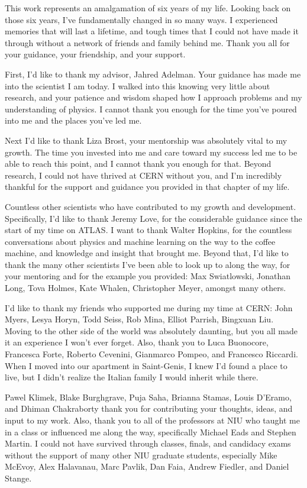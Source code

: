 This work represents an amalgamation of six years of my life. Looking back on those six years, I've fundamentally changed in so many ways. I experienced memories that will last a lifetime, and tough times that I could not have made it through without a network of friends and family behind me. Thank you all for your guidance, your friendship, and your support.

First, I'd like to thank my advisor, Jahred Adelman. Your guidance has made me into the scientist I am today. I walked into this knowing very little about research, and your patience and wisdom shaped how I approach problems and my understanding of physics. I cannot thank you enough for the time you've poured into me and the places you've led me.

Next I'd like to thank Liza Brost, your mentorship was absolutely vital to my growth. The time you invested into me and care toward my success led me to be able to reach this point, and I cannot thank you enough for that. Beyond research, I could not have thrived at CERN without you, and I'm incredibly thankful for the support and guidance you provided in that chapter of my life.

Countless other scientists who have contributed to my growth and development. Specifically, I'd like to thank Jeremy Love, for the considerable guidance since the start of my time on ATLAS. I want to thank Walter Hopkins, for the countless conversations about physics and machine learning on the way to the coffee machine, and knowledge and insight that brought me. Beyond that, I'd like to thank the many other scientists I've been able to look up to along the way, for your mentoring and for the example you provided: Max Swiatlowski, Jonathan Long, Tova Holmes, Kate Whalen, Christopher Meyer, amongst many others.

I'd like to thank my friends who supported me during my time at CERN: John Myers, Lesya Horyn, Todd Seiss, Rob Mina, Elliot Parrish, Bingxuan Liu. Moving to the other side of the world was absolutely daunting, but you all made it an experience I won't ever forget. Also, thank you to Luca Buonocore, Francesca Forte, Roberto Cevenini, Gianmarco Pompeo, and Francesco Riccardi. When I moved into our apartment in Saint-Genis, I knew I'd found a place to live, but I didn't realize the Italian family I would inherit while there. 

Pawel Klimek, Blake Burghgrave, Puja Saha, Brianna Stamas, Louis D'Eramo, and Dhiman Chakraborty thank you for contributing your thoughts, ideas, and input to my work. Also, thank you to all of the professors at NIU who taught me in a class or influenced me along the way, specifically Michael Eads and Stephen Martin. I could not have survived through classes, finals, and candidacy exams without the support of many other NIU graduate students, especially Mike McEvoy, Alex Halavanau, Marc Pavlik, Dan Faia, Andrew Fiedler, and Daniel Stange. 

